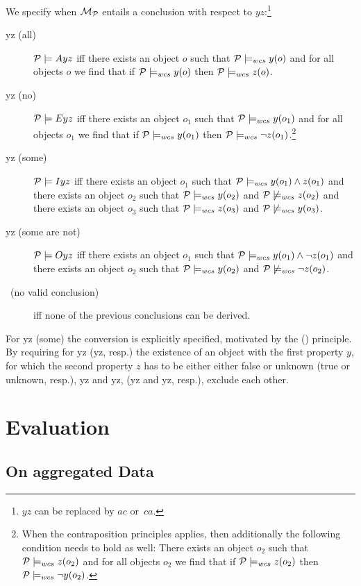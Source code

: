 \documentclass[12pt]{article}
\begin{document}
We specify when ${\cal M}_{\cal P}$ entails a conclusion with respect to $yz$:\footnote{$yz$ can be replaced by $ac$ or~$ca$.}
\begin{description}
\item[\MA yz (all)] ${\cal P} \models Ayz$ iff there exists an object $o$ such that ${\cal P} \models_{wcs}
y(o)$ and for all objects $o$ we find that if ${\cal P} \models_{wcs} y(o)$ then ${\cal P} \models_{wcs} z(o)$.
\item [\ME yz (no)]
${\cal P} \models Eyz$ iff there exists an object $o_1$ such that ${\cal P} \models_{wcs}
y(o_1)$ and for all objects $o_1$ we find that if ${\cal P} \models_{wcs} y(o_1)$ then
${\cal P} \models_{wcs} \neg z(o_1)$.\footnote{
When the contraposition principles applies, then additionally 
the following condition needs to hold as well: There exists an object $o_2$ such that ${\cal P} \models_{wcs}
z(o_2)$ and for all objects $o_2$ we find that if ${\cal P} \models_{wcs} z(o_2)$ then
${\cal P} \models_{wcs} \neg y(o_2)$.}
\item[\MI yz (some)]
${\cal P} \models Iyz$ iff there exists an object $o_1$ such that ${\cal P} \models_{wcs}
y(o_1) \wedge z(o_1)$ and there exists an
object $o_2$ such that ${\cal P} \models_{wcs} y(o_2)$ and
${\cal P} \not\models_{wcs} z(o_2)$ and
there exists an
object $o_3$ such that ${\cal P} \models_{wcs} z(o_3)$ and
${\cal P} \not\models_{wcs} y(o_3)$.
\item[\MO yz (some are not)]
${\cal P} \models Oyz$ iff there exists an object $o_1$ such that ${\cal P} \models_{wcs}
y(o_1) \wedge \neg z(o_1)$ and there exists an
object $o_2$ such that ${\cal P} \models_{wcs} y(o_2)$ and
${\cal P} \not\models_{wcs} \neg z(o_2)$.
\item[\NVC\ (no valid conclusion)] iff none of the previous conclusions can be derived.
\end{description}
For \MI yz (some) the conversion is explicitly specified, motivated by the (\converse) principle.
By requiring for \MI yz (\MO yz, resp.) the existence of an object with the first property $y$,
for which the second property $z$ has to be either either false or unknown (true or unknown, resp.),
\MA yz and \MI yz, (\ME yz and \MO yz, resp.), exclude each other.

\section{Evaluation} \label{sect:aggregateddata}



\subsection{On aggregated Data}
\end{document}
